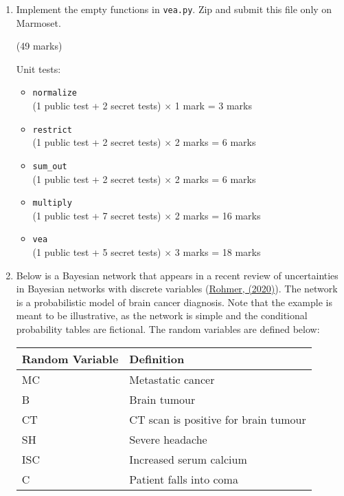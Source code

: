 \documentclass[12pt]{article}
\begin{document}
\begin{enumerate}[font=\Large,label=(\alph*)]

\item 
Implement the empty functions in \verb+vea.py+. Zip and submit this file only on Marmoset.
    
\begin{markscheme}
(49 marks)

Unit tests:
\begin{itemize}
    
    \item \verb+normalize+ \\
    (1 public test + 2 secret tests) $\times$ 1 mark = 3 marks

    \item \verb+restrict+ \\
    (1 public test + 2 secret tests) $\times$ 2 marks = 6 marks
    
    \item \verb+sum_out+ \\
    (1 public test + 2 secret tests) $\times$ 2 marks = 6 marks

    \item \verb+multiply+ \\
    (1 public test + 7 secret tests) $\times$ 2 marks = 16 marks
    
    \item \verb+vea+ \\
    (1 public test + 5 secret tests) $\times$ 3 marks = 18 marks

\end{itemize}
    
\end{markscheme}

\item
Below is a Bayesian network that appears in a recent review of uncertainties in Bayesian networks with discrete variables (\href{https://www.sciencedirect.com/science/article/abs/pii/S0952197619303045}{Rohmer, (2020)}). The network is a probabilistic model of brain cancer diagnosis. Note that the example is meant to be illustrative, as the network is simple and the conditional probability tables are fictional. The random variables are defined below: \\

\begin{table}[ht!]
    \centering
    \begin{tabular}{l|l}
         Random Variable & Definition \\
         \hline
         MC & Metastatic cancer \\ 
         B & Brain tumour \\ 
         CT & CT scan is positive for brain tumour \\ 
         SH & Severe headache \\ 
         ISC & Increased serum calcium \\ 
         C & Patient falls into coma \\
    \end{tabular}
    \label{tab:random_vars}
\end{table}



\end{enumerate}
\end{document}
